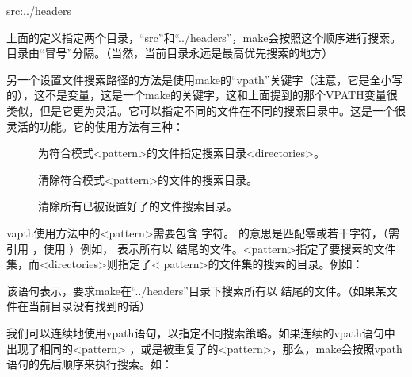 \documentclass[a4paper,10pt]{sphinxmanual}
\begin{document}
\begin{sphinxVerbatim}[commandchars=\\\{\}]
  src:../headers
\end{sphinxVerbatim}

上面的定义指定两个目录，“src”和“../headers”，make会按照这个顺序进行搜索。目录由“冒号”分隔。（当然，当前目录永远是最高优先搜索的地方）

另一个设置文件搜索路径的方法是使用make的“vpath”关键字（注意，它是全小写的），这不是变量，这是一个make的关键字，这和上面提到的那个VPATH变量很类似，但是它更为灵活。它可以指定不同的文件在不同的搜索目录中。这是一个很灵活的功能。它的使用方法有三种：
\begin{description}
\item[{}] \leavevmode
为符合模式\textless{}pattern\textgreater{}的文件指定搜索目录\textless{}directories\textgreater{}。

\item[{}] \leavevmode
清除符合模式\textless{}pattern\textgreater{}的文件的搜索目录。

\item[{}] \leavevmode
清除所有已被设置好了的文件搜索目录。

\end{description}

vapth使用方法中的\textless{}pattern\textgreater{}需要包含 \sphinxcode{\sphinxupquote{\%}} 字符。 \sphinxcode{\sphinxupquote{\%}} 的意思是匹配零或若干字符，（需引用
\sphinxcode{\sphinxupquote{\%}} ，使用 \sphinxcode{\sphinxupquote{\textbackslash{}}} ）例如，  表示所有以  结尾的文件。\textless{}pattern\textgreater{}指定了要搜索的文件集，而\textless{}directories\textgreater{}则指定了\textless{} pattern\textgreater{}的文件集的搜索的目录。例如：

\begin{sphinxVerbatim}[commandchars=\\\{\}]
\end{sphinxVerbatim}

该语句表示，要求make在“../headers”目录下搜索所有以  结尾的文件。（如果某文件在当前目录没有找到的话）

我们可以连续地使用vpath语句，以指定不同搜索策略。如果连续的vpath语句中出现了相同的\textless{}pattern\textgreater{}
，或是被重复了的\textless{}pattern\textgreater{}，那么，make会按照vpath语句的先后顺序来执行搜索。如：
\end{document}
